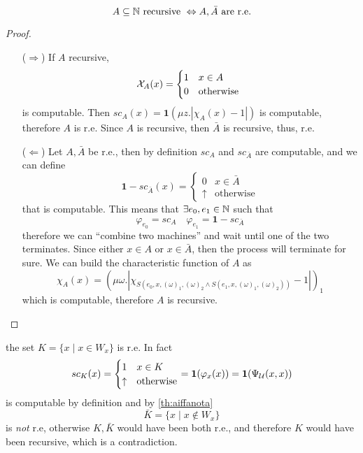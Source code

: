 \begin{observation}\label{th:aiffanota}
  \[A \subseteq \mathbb{N} \mbox{ recursive } \Leftrightarrow A, \bar{A} \mbox{
      are r.e.} \]
  \begin{proof}
    \begin{itemize}
    \item[($\Rightarrow$)]
      If $A$ recursive,
      \begin{equation*}
        \mathcal{X}_A(x)= \begin{cases}
          1 & x\in A \\
          0 & $otherwise $
        \end{cases}
      \end{equation*}
      is computable.
      Then $ sc_A(x) = \mathbf{1}(\mu z. | \chi_A(x)- 1 | )$
      is computable, therefore ${A}$ is r.e. Since $A$ is recursive, then
      $\bar{A}$ is recursive, thus, r.e. 

    \item[($\Leftarrow$)] Let $A, \bar{A}$ be r.e., then by definition
      $sc_A$ and $sc_{\bar{A}}$ are computable, and we can define
      \[
        \mathbf{1} - sc_{\bar{A}}(x) = \begin{cases}
          0 & x \in \bar{A} \\
          \uparrow & \mbox{otherwise}
        \end{cases}
      \]
      that is computable. This means that $\exists e_0, e_1 \in \mathbb{N}$ such that
      \[
        \varphi_{e_0} = sc_A \quad \varphi_{e_1} = \mathbf{1} -
        sc_{\bar{A}}
      \]
      therefore we can ``combine two machines'' and wait until one
      of the two terminates. Since either $x \in A$ or $x \in \bar{A}$,
      then the process will terminate for sure. We can build the characteristic function of $A$ as
      \[
          \chi_A(x) = (\mu \omega . |\chi_{S(e_0, x,
            (\omega)_1, (\omega)_2 \wedge S(e_1, x, (\omega)_1,
            (\omega)_2))}-1|)_1
        \]
        which is computable, therefore $A$ is recursive.
    \end{itemize}
  \end{proof}
\end{observation}

\begin{observation}
  the set $K = \{x \mid x \in W_x\}$ is r.e. In fact
  \[
    sc_K(x) = \begin{cases}
      1 & x \in K \\
      \uparrow & \mbox{otherwise}
    \end{cases}
    = \mathbf{1}(\varphi_x(x)) = \mathbf{1}(\Psi_{\mathcal{U}}(x,x))
  \]
  is computable by definition and by \ref{th:aiffanota}
  \[
    \bar{K} = \{x \mid x \notin W_x\}
  \]
  is \emph{not} r.e, otherwise $K,\bar{K}$ would have been both r.e.,
  and therefore $K$ would have been recursive, which is a
  contradiction.
\end{observation}

